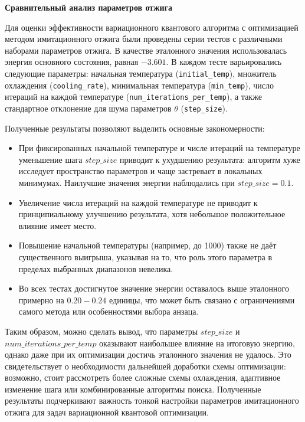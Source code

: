 \documentclass[a4paper]{report}
\begin{document}
\noindent
\textbf{Сравнительный анализ параметров отжига}

Для оценки эффективности вариационного квантового алгоритма с оптимизацией методом имитационного отжига были проведены серии тестов с различными наборами параметров отжига. В качестве эталонного значения использовалась энергия основного состояния, равная $-3.601$. В каждом тесте варьировались следующие параметры: начальная температура (\texttt{initial\_temp}), множитель охлаждения (\texttt{cooling\_rate}), минимальная температура (\texttt{min\_temp}), число итераций на каждой температуре (\texttt{num\_iterations\_per\_temp}), а также стандартное отклонение для шума параметров $\theta$ (\texttt{step\_size}).

Полученные результаты позволяют выделить основные закономерности:

\begin{itemize}
    \item При фиксированных начальной температуре и числе итераций на температуре уменьшение шага $step\_size$ приводит к ухудшению результата: алгоритм хуже исследует пространство параметров и чаще застревает в локальных минимумах. Наилучшие значения энергии наблюдались при $step\_size = 0.1$.
    \item Увеличение числа итераций на каждой температуре не приводит к принципиальному улучшению результата, хотя небольшое положительное влияние имеет место.
    \item Повышение начальной температуры (например, до 1000) также не даёт существенного выигрыша, указывая на то, что роль этого параметра в пределах выбранных диапазонов невелика.
    \item Во всех тестах достигнутое значение энергии оставалось выше эталонного примерно на $0.20-0.24$ единицы, что может быть связано с ограничениями самого метода или особенностями выбора анзаца.
\end{itemize}

Таким образом, можно сделать вывод, что параметры $step\_size$ и $num\_iterations\_per\_temp$ оказывают наибольшее влияние на итоговую энергию, однако даже при их оптимизации достичь эталонного значения не удалось. Это свидетельствует о необходимости дальнейшей доработки схемы оптимизации: возможно, стоит рассмотреть более сложные схемы охлаждения, адаптивное изменение шага или комбинированные алгоритмы поиска. Полученные результаты подчеркивают важность тонкой настройки параметров имитационного отжига для задач вариационной квантовой оптимизации.
\end{document}
